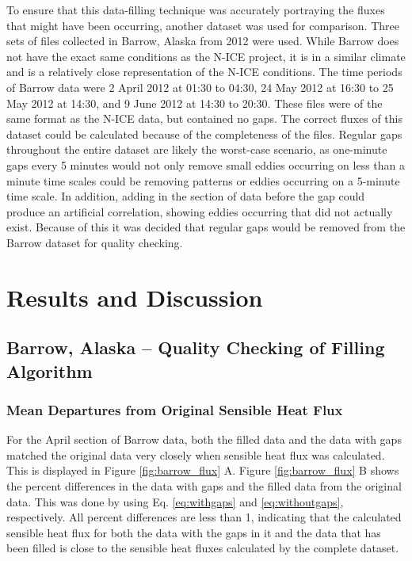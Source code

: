 To ensure that this data-filling technique was accurately portraying the fluxes that might have been occurring, another dataset was used for comparison. Three sets of files collected in Barrow, Alaska from 2012 were used. While Barrow does not have the exact same conditions as the N-ICE project, it is in a similar climate and is a relatively close representation of the N-ICE conditions. The time periods of Barrow data were 2 April 2012 at 01:30 to 04:30, 24 May 2012 at 16:30 to 25 May 2012 at 14:30, and 9 June 2012 at 14:30 to 20:30. These files were of the same format as the N-ICE data, but contained no gaps.  The correct fluxes of this dataset could be calculated because of the completeness of the files. Regular gaps throughout the entire dataset are likely the worst-case scenario, as one-minute gaps every 5 minutes would not only remove small eddies occurring on less than a minute time scales could be removing patterns or eddies occurring on a 5-minute time scale. In addition, adding in the section of data before the gap could produce an artificial correlation, showing eddies occurring that did not actually exist. Because of this it was decided that regular gaps would be removed from the Barrow dataset for quality checking. 

\section{Results and Discussion}
\subsection{Barrow, Alaska – Quality Checking of Filling Algorithm}
\subsubsection{Mean Departures from Original Sensible Heat Flux}

For the April section of Barrow data, both the filled data and the data with gaps matched the original data very closely when sensible heat flux was calculated. This is displayed in Figure \ref{fig:barrow_flux} A. Figure \ref{fig:barrow_flux} B shows the percent differences in the data with gaps and the filled data from the original data. This was done by using Eq. \ref{eq:withgaps} and \ref{eq:withoutgaps}, respectively. All percent differences are less than 1, indicating that the calculated sensible heat flux for both the data with the gaps in it and the data that has been filled is close to the sensible heat fluxes calculated by the complete dataset.

